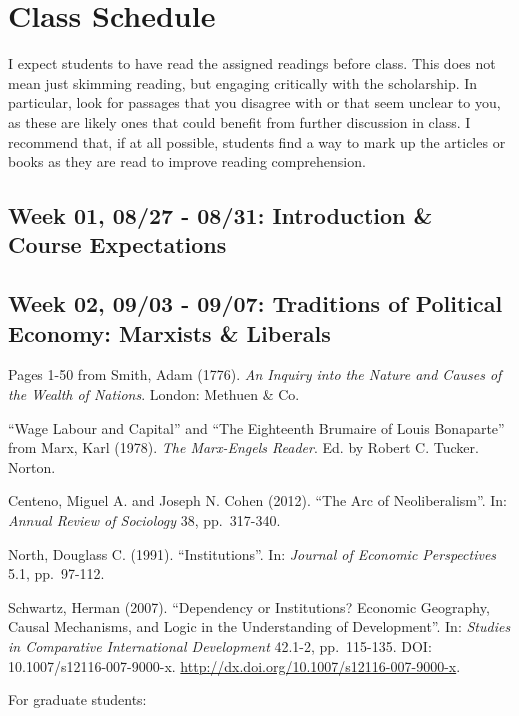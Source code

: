 \documentclass[11pt,]{article}
\begin{document}
\newpage

\section{Class Schedule}\label{class-schedule}

I expect students to have read the assigned readings before class. This
does not mean just skimming reading, but engaging critically with the
scholarship. In particular, look for passages that you disagree with or
that seem unclear to you, as these are likely ones that could benefit
from further discussion in class. I recommend that, if at all possible,
students find a way to mark up the articles or books as they are read to
improve reading comprehension.

\subsection{Week 01, 08/27 - 08/31: Introduction \& Course
Expectations}\label{week-01-0827---0831-introduction-course-expectations}

\subsection{Week 02, 09/03 - 09/07: Traditions of Political Economy:
Marxists \&
Liberals}\label{week-02-0903---0907-traditions-of-political-economy-marxists-liberals}

Pages 1-50 from Smith, Adam (1776).
\emph{An Inquiry into the Nature and Causes of the Wealth of Nations}.
London: Methuen \& Co.

``Wage Labour and Capital'' and ``The Eighteenth Brumaire of Louis
Bonaparte'' from Marx, Karl (1978). \emph{The Marx-Engels Reader}. Ed.
by Robert C. Tucker. Norton.

Centeno, Miguel A. and Joseph N. Cohen (2012). ``The Arc of
Neoliberalism''. In: \emph{Annual Review of Sociology} 38, pp.~317-340.

North, Douglass C. (1991). ``Institutions''. In:
\emph{Journal of Economic Perspectives} 5.1, pp.~97-112.

Schwartz, Herman (2007). ``Dependency or Institutions? Economic
Geography, Causal Mechanisms, and Logic in the Understanding of
Development''. In:
\emph{Studies in Comparative International Development} 42.1-2,
pp.~115-135. DOI: 10.1007/s12116-007-9000-x.
\url{http://dx.doi.org/10.1007/s12116-007-9000-x}.

For graduate students:
\end{document}
